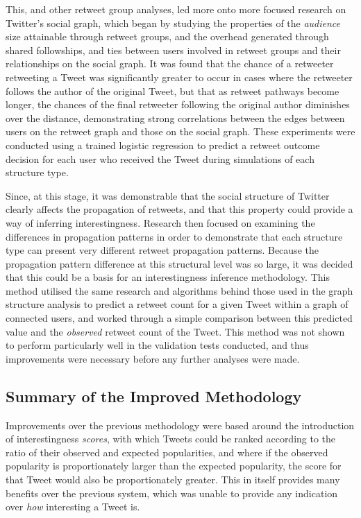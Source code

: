 This, and other retweet group analyses, led more onto more focused research on Twitter's social graph, which began by studying the properties of the \textit{audience} size attainable through retweet groups, and the overhead generated through shared followships, and ties between users involved in retweet groups and their relationships on the social graph. It was found that the chance of a retweeter retweeting a Tweet was significantly greater to occur in cases where the retweeter follows the author of the original Tweet, but that as retweet pathways become longer, the chances of the final retweeter following the original author diminishes over the distance, demonstrating strong correlations between the edges between users on the retweet graph and those on the social graph. These experiments were conducted using a trained logistic regression to predict a retweet outcome decision for each user who received the Tweet during simulations of each structure type.

Since, at this stage, it was demonstrable that the social structure of Twitter clearly affects the propagation of retweets, and that this property could provide a way of inferring interestingness. Research then focused on examining the differences in propagation patterns in order to demonstrate that each structure type can present very different retweet propagation patterns. Because the propagation pattern difference at this structural level was so large, it was decided that this could be a basis for an interestingness inference methodology. This method utilised the same research and algorithms behind those used in the graph structure analysis to predict a retweet count for a given Tweet within a graph of connected users, and worked through a simple comparison between this predicted value and the \textit{observed} retweet count of the Tweet. This method was not shown to perform particularly well in the validation tests conducted, and thus improvements were necessary before any further analyses were made.


\subsection{Summary of the Improved Methodology}
Improvements over the previous methodology were based around the introduction of interestingness \textit{scores}, with which Tweets could be ranked according to the ratio of their observed and expected popularities, and where if the observed popularity is proportionately larger than the expected popularity, the score for that Tweet would also be proportionately greater. This in itself provides many benefits over the previous system, which was unable to provide any indication over \textit{how} interesting a Tweet is.

